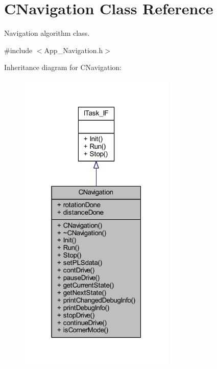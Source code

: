 \hypertarget{class_c_navigation}{}\section{C\+Navigation Class Reference}
\label{class_c_navigation}


Navigation algorithm class.  




{\ttfamily \#include $<$App\+\_\+\+Navigation.\+h$>$}



Inheritance diagram for C\+Navigation\+:
\nopagebreak
\begin{figure}[H]
\begin{center}
\leavevmode
\includegraphics[width=211pt]{class_c_navigation__inherit__graph}
\end{center}
\end{figure}


